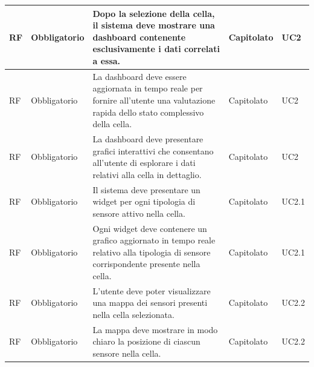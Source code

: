 \documentclass{article}
\begin{document}
\begin{longtable}{|C{1cm}|C{2cm}|>{\raggedright}m{5cm}|C{1.5cm}|C{2cm}|}
    \hline
     RF & Obbligatorio        & Dopo la selezione della cella, il sistema deve mostrare una dashboard contenente esclusivamente i dati correlati a essa.                                                                                                           & Capitolato      & UC2               \\
    \hline
     RF & Obbligatorio        & La dashboard deve essere aggiornata in tempo reale per fornire all'utente una valutazione rapida dello stato complessivo della cella.                                                                                              & Capitolato      & UC2               \\
    \hline
     RF & Obbligatorio        & La dashboard deve presentare grafici interattivi che consentano all'utente di esplorare i dati relativi alla cella in dettaglio.                                                                                                   & Capitolato      & UC2               \\
    \hline
     RF & Obbligatorio        & Il sistema deve presentare un widget per ogni tipologia di sensore attivo nella cella.                                                                                                                                             & Capitolato      & UC2.1               \\
    \hline
     RF & Obbligatorio        & Ogni widget deve contenere un grafico aggiornato in tempo reale relativo alla tipologia di sensore corrispondente presente nella cella.                                                                                            & Capitolato      & UC2.1               \\
    \hline
     RF & Obbligatorio        & L'utente deve poter visualizzare una mappa dei sensori presenti nella cella selezionata.                                                                                                                                           & Capitolato      & UC2.2               \\
    \hline
     RF & Obbligatorio        & La mappa deve mostrare in modo chiaro la posizione di ciascun sensore nella cella.                                                                                                                                                 & Capitolato      & UC2.2               \\

\end{longtable}
\end{document}
